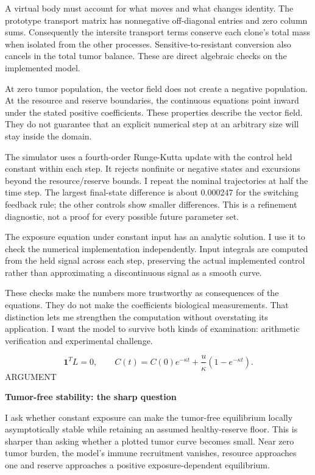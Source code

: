 \documentclass[10pt]{article}
\begin{document}
A virtual body must account for what moves and what changes identity. The prototype transport matrix has nonnegative off-diagonal entries and zero column sums. Consequently the intersite transport terms conserve each clone's total mass when isolated from the other processes. Sensitive-to-resistant conversion also cancels in the total tumor balance. These are direct algebraic checks on the implemented model.\par
At zero tumor population, the vector field does not create a negative population. At the resource and reserve boundaries, the continuous equations point inward under the stated positive coefficients. These properties describe the vector field. They do not guarantee that an explicit numerical step at an arbitrary size will stay inside the domain.\par
The simulator uses a fourth-order Runge-Kutta update with the control held constant within each step. It rejects nonfinite or negative states and excursions beyond the resource/reserve bounds. I repeat the nominal trajectories at half the time step. The largest final-state difference is about 0.000247 for the switching feedback rule; the other controls show smaller differences. This is a refinement diagnostic, not a proof for every possible future parameter set.\par
The exposure equation under constant input has an analytic solution. I use it to check the numerical implementation independently. Input integrals are computed from the held signal across each step, preserving the actual implemented control rather than approximating a discontinuous signal as a smooth curve.\par
These checks make the numbers more trustworthy as consequences of the equations. They do not make the coefficients biological measurements. That distinction lets me strengthen the computation without overstating its application. I want the model to survive both kinds of examination: arithmetic verification and experimental challenge.\par
\[\mathbf 1^T L=0,\qquad C(t)=C(0)e^{-\kappa t}+\frac{u}{\kappa}(1-e^{-\kappa t}).\]
\clearpage
\hypertarget{p16}{}
{\small\color{accent}\MakeUppercase{Argument}}\par
{\LARGE\bfseries\color{ink}Tumor-free stability: the sharp question}\par\vspace{5pt}
I ask whether constant exposure can make the tumor-free equilibrium locally asymptotically stable while retaining an assumed healthy-reserve floor. This is sharper than asking whether a plotted tumor curve becomes small. Near zero tumor burden, the model's immune recruitment vanishes, resource approaches one and reserve approaches a positive exposure-dependent equilibrium.\par
\end{document}
